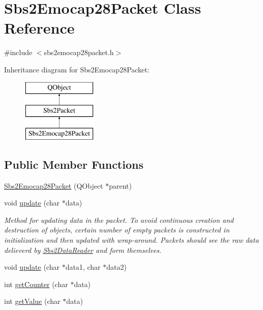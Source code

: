 \hypertarget{classSbs2Emocap28Packet}{\section{Sbs2\-Emocap28\-Packet Class Reference}
\label{classSbs2Emocap28Packet}
}


{\ttfamily \#include $<$sbs2emocap28packet.\-h$>$}

Inheritance diagram for Sbs2\-Emocap28\-Packet\-:\begin{figure}[H]
\begin{center}
\leavevmode
\includegraphics[height=3.000000cm]{classSbs2Emocap28Packet}
\end{center}
\end{figure}
\subsection*{Public Member Functions}
\begin{DoxyCompactItemize}
\item 
\hyperlink{classSbs2Emocap28Packet_a9cdf024eb45f98a684a769546ce6c0cc}{Sbs2\-Emocap28\-Packet} (Q\-Object $\ast$parent)
\item 
void \hyperlink{classSbs2Emocap28Packet_a5fe0695a677da249df1226c310926716}{update} (char $\ast$data)
\begin{DoxyCompactList}\small\item\em Method for updating data in the packet. To avoid continuous creation and destruction of objects, certain number of empty packets is constructed in initialization and then updated with wrap-\/around. Packets should see the raw data delieverd by \hyperlink{classSbs2DataReader}{Sbs2\-Data\-Reader} and form themselves. \end{DoxyCompactList}\item 
void \hyperlink{classSbs2Emocap28Packet_ab8e2defdaf6cdf3586e5fab59359d66d}{update} (char $\ast$data1, char $\ast$data2)
\item 
int \hyperlink{classSbs2Emocap28Packet_a4b3a6363a12c66a81a939f5c5e1e3c9a}{get\-Counter} (char $\ast$data)
\item 
int \hyperlink{classSbs2Emocap28Packet_a5f097181f28c069fbd50d89d821126a0}{get\-Value} (char $\ast$data)
\end{DoxyCompactItemize}
